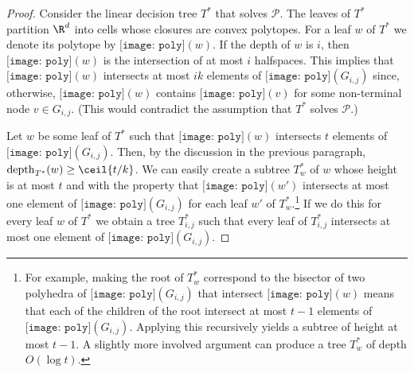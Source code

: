 \documentclass{patmorin}
\newcommand{\depth}{\mathrm{depth}}
\newcommand{\poly}{\texttt{[image: poly]}}
\begin{document}
\begin{proof}
  Consider the linear decision tree $T^*$ that solves $\mathcal{P}$.
  The leaves of $T^*$ partition $\R^d$ into cells whose closures are
  convex polytopes.  For a leaf $w$ of $T^*$ we denote its polytope
  by $\poly(w)$. If the depth of $w$ is $i$, then $\poly(w)$ is
  the intersection of  at most $i$ halfspaces.  This implies that
  $\poly(w)$ intersects at most $ik$ elements of $\poly(G_{i,j})$ since,
  otherwise, $\poly(w)$ contains $\poly(v)$ for some non-terminal node
  $v\in G_{i,j}$.  (This would contradict the assumption that $T^*$
  solves $\mathcal{P}$.)

  Let $w$ be some leaf of $T^*$ such that $\poly(w)$ intersects $t$
  elements of $\poly(G_{i,j})$.  Then, by the discussion in the previous
  paragraph, $\depth_{T^*}(w) \ge \ceil{t/k}$.  We can easily create a
  subtree $T_w^*$ of $w$ whose height is at most $t$ and with the property
  that $\poly(w')$ intersects at most one element of $\poly(G_{i,j})$
  for each leaf $w'$ of $T_w^*$.\footnote{For example, making the root of
  $T^*_w$ correspond to the bisector of two polyhedra of $\poly(G_{i,j})$
  that intersect $\poly(w)$ means that each of the children of the root
  intersect at most $t-1$ elements of $\poly(G_{i,j})$. Applying this
  recursively yields a subtree of height at most $t-1$.  A slightly more
  involved argument can produce a tree $T^*_w$ of depth $O(\log t)$.} If
  we do this for every leaf $w$ of $T^*$ we obtain a tree $T^{*}_{i,j}$
  such that every leaf of $T^*_{i,j}$ intersects at most one element
  of $\poly(G_{i,j})$.


\end{proof}
\end{document}
